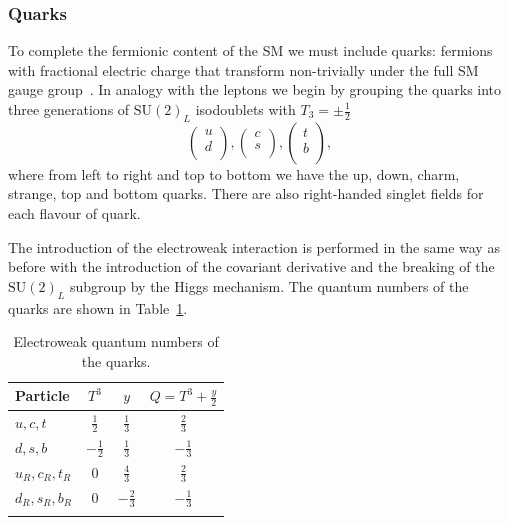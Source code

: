 \subsubsection{Quarks}
To complete the fermionic content of the SM we must include quarks: fermions with fractional electric charge that transform non-trivially under the full SM gauge group~\cite{PDG}. 
In analogy with the leptons we begin by grouping the quarks into three generations of $\mathrm{SU}(2)_{L}$ isodoublets with $T_{3} = \pm\frac{1}{2}$
\begin{equation}
    \label{eq:theory:quark_isodoublets}
    \begin{pmatrix}
        u \\
        d \\
    \end{pmatrix},
    \begin{pmatrix}
        c \\
        s \\
    \end{pmatrix},
    \begin{pmatrix}
        t \\
        b \\
    \end{pmatrix},
\end{equation}
where from left to right and top to bottom we have the up, down, charm, strange, top and bottom quarks. There are also right-handed singlet fields for each flavour of quark. 

The introduction of the electroweak interaction is performed in the same way as before with the introduction of the covariant derivative and the breaking of the $\mathrm{SU}(2)_{L}$ subgroup by the Higgs mechanism. The quantum numbers of the quarks are shown in Table~\ref{tab:theory:elecroweak_qn_quarks}.
\begin{table}[h!]
    \centering
\renewcommand{\arraystretch}{1.3}
\begin{tabular}{ l | c c c }
    \thickhline
    Particle & $T^{3}$ & $y$ & $Q = T^3 + \frac{y}{2}$ \\
    \hline
    $u,c,t$ & $\frac{1}{2}$ & $\frac{1}{3}$ & $\frac{2}{3}$\\ 
    $d,s,b$ & $-\frac{1}{2}$ & $\frac{1}{3}$ & $-\frac{1}{3}$\\ 
    $u_{R},c_{R},t_{R}$    & $0$ & $\frac{4}{3}$ & $\frac{2}{3}$\\ 
    $d_{R},s_{R},b_{R}$    & $0$ & $-\frac{2}{3}$ & $-\frac{1}{3}$\\ 
    \thickhline
\end{tabular}%
\caption{Electroweak quantum numbers of the quarks.}
\label{tab:theory:elecroweak_qn_quarks}
\end{table}

